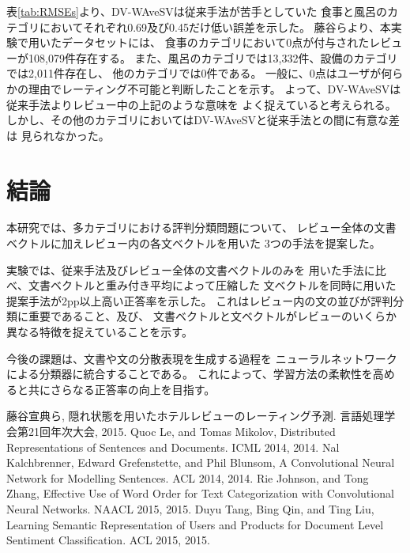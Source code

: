 \documentclass[twocolumn,a4paper]{ltjarticle}
\begin{document}
表\ref{tab:RMSEs}より、DV-WAveSVは従来手法\cite{fujitani15}が苦手としていた
食事と風呂のカテゴリにおいてそれぞれ0.69及び0.45だけ低い誤差を示した。
藤谷ら\cite{fujitani15}より、本実験で用いたデータセットには、
食事のカテゴリにおいて0点が付与されたレビューが108,079件存在する。
また、風呂のカテゴリでは13,332件、設備のカテゴリでは2,011件存在し、
他のカテゴリでは0件である。
一般に、0点はユーザが何らかの理由でレーティング不可能と判断したことを示す。
よって、DV-WAveSVは従来手法\cite{fujitani15}よりレビュー中の上記のような意味を
よく捉えていると考えられる。
しかし、その他のカテゴリにおいてはDV-WAveSVと従来手法との間に有意な差は
見られなかった。



\section{結論}

本研究では、多カテゴリにおける評判分類問題について、
レビュー全体の文書ベクトルに加えレビュー内の各文ベクトルを用いた
3つの手法を提案した。

実験では、従来手法\cite{fujitani15}及びレビュー全体の文書ベクトルのみを
用いた手法に比べ、文書ベクトルと重み付き平均によって圧縮した
文ベクトルを同時に用いた提案手法が2pp以上高い正答率を示した。
これはレビュー内の文の並びが評判分類に重要であること、及び、
文書ベクトルと文ベクトルがレビューのいくらか異なる特徴を捉えていることを示す。

今後の課題は、文書や文の分散表現を生成する過程を
ニューラルネットワークによる分類器に統合することである。
これによって、学習方法の柔軟性を高めると共にさらなる正答率の向上を目指す。

%
%





\begin{thebibliography}{9}
  藤谷宣典ら,
  隠れ状態を用いたホテルレビューのレーティング予測.
  言語処理学会第21回年次大会, 2015.
  Quoc Le, and Tomas Mikolov,
  Distributed Representations of Sentences and Documents.
  ICML 2014, 2014.
  Nal Kalchbrenner, Edward Grefenstette, and Phil Blunsom,
  A Convolutional Neural Network for Modelling Sentences.
  ACL 2014, 2014.
  Rie Johnson, and Tong Zhang,
  Effective Use of Word Order for Text Categorization
  with Convolutional Neural Networks.
  NAACL 2015, 2015.
  Duyu Tang, Bing Qin, and Ting Liu,
  Learning Semantic Representation of Users and Products
  for Document Level Sentiment Classification.
  ACL 2015, 2015.
\end{thebibliography}
\end{document}
